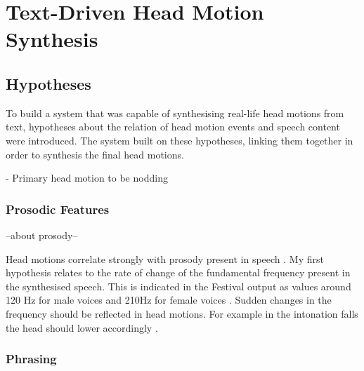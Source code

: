 \documentclass[bsc,frontabs,twoside,singlespacing,parskip]{infthesis}
\begin{document}
\chapter{Text-Driven Head Motion Synthesis}


\section{Hypotheses}

To build a system that was capable of synthesising real-life head motions from text, hypotheses about the relation of head motion events and speech content were introduced. The system built on these hypotheses, linking them together in order to synthesis the final head motions. 

\cite{first_paper} 
- Primary head motion to be nodding \\

\subsection{Prosodic Features}

--about prosody-- 

Head motions correlate strongly with prosody present in speech \cite{vis_prosody}. My first hypothesis relates to the rate of change of the fundamental frequency present in the synthesised speech. This is indicated in the Festival output as values around 120 Hz for male voices and 210Hz for female voices \cite{f0_values}. Sudden changes in the frequency should be reflected in head motions. For example in the intonation falls the head should lower accordingly \cite{Kendon}.

\subsection{Phrasing}
\end{document}
